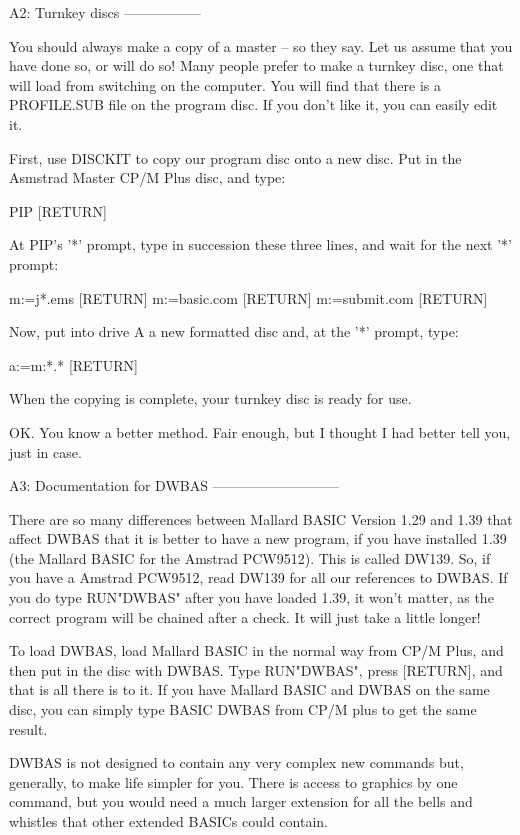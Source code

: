 A2: Turnkey discs
-----------------

You  should always make a copy of a master -- so they say. Let us assume  that 
you  have done so, or will do so! Many people prefer to make a  turnkey  disc, 
one that will load from switching on the computer. You will find that there is 
a  PROFILE.SUB file on the program disc. If you don't like it, you can  easily 
edit it.

First,  use  DISCKIT  to copy our program disc onto a new  disc.  Put  in  the 
Asmstrad Master CP/M Plus disc, and type:

        PIP [RETURN]

At  PIP's '*' prompt, type in succession these three lines, and wait  for  the 
next '*' prompt:

        m:=j*.ems [RETURN]
        m:=basic.com [RETURN]
        m:=submit.com [RETURN]

Now, put into drive A a new formatted disc and, at the '*' prompt, type:

        a:=m:*.* [RETURN]

When the copying is complete, your turnkey disc is ready for use.

OK.  You  know a better method. Fair enough, but I thought I had  better  tell 
you, just in case.


A3: Documentation for DWBAS
---------------------------

There are so many differences between Mallard BASIC Version 1.29 and 1.39 that 
affect  DWBAS that it is better to have a new program, if you  have  installed 
1.39 (the Mallard BASIC for the Amstrad PCW9512). This is called DW139. So, if 
you have a Amstrad PCW9512, read DW139 for all our references to DWBAS. If you 
do type RUN"DWBAS" after you have loaded 1.39, it won't matter, as the correct 
program will be chained after a check. It will just take a little longer!

To  load DWBAS, load Mallard BASIC in the normal way from CP/M Plus, and  then 
put  in the disc with DWBAS. Type RUN"DWBAS", press [RETURN], and that is  all 
there is to it. If you have Mallard BASIC and DWBAS on the same disc, you  can 
simply type BASIC DWBAS from CP/M plus to get the same result.

DWBAS is not designed to contain any very complex new commands but, generally, 
to make life simpler for you. There is access to graphics by one command,  but 
you  would  need a much larger extension for all the bells and  whistles  that 
other extended BASICs could contain.

